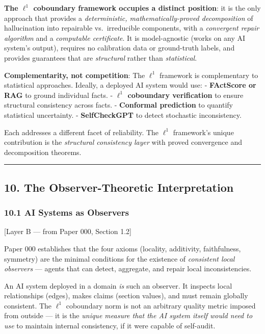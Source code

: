 \documentclass[
]{article}
\begin{document}
\textbf{The \(\ell^1\) coboundary framework occupies a distinct
position}: it is the only approach that provides a \emph{deterministic,
mathematically-proved decomposition} of hallucination into repairable
vs.~irreducible components, with a \emph{convergent repair algorithm}
and a \emph{computable certificate}. It is model-agnostic (works on any
AI system's output), requires no calibration data or ground-truth
labels, and provides guarantees that are \emph{structural} rather than
\emph{statistical}.

\textbf{Complementarity, not competition}: The \(\ell^1\) framework is
complementary to statistical approaches. Ideally, a deployed AI system
would use: - \textbf{FActScore or RAG} to ground individual facts. -
\textbf{\(\ell^1\) coboundary verification} to ensure structural
consistency across facts. - \textbf{Conformal prediction} to quantify
statistical uncertainty. - \textbf{SelfCheckGPT} to detect stochastic
inconsistency.

Each addresses a different facet of reliability. The \(\ell^1\)
framework's unique contribution is the \emph{structural consistency
layer} with proved convergence and decomposition theorems.

\begin{center}\rule{0.5\linewidth}{0.5pt}\end{center}

\subsection{10. The Observer-Theoretic
Interpretation}\label{the-observer-theoretic-interpretation}

\subsubsection{10.1 AI Systems as
Observers}\label{ai-systems-as-observers}

{[}Layer B --- from Paper 000, Section 1.2{]}

Paper 000 establishes that the four axioms (locality, additivity,
faithfulness, symmetry) are the minimal conditions for the existence of
\emph{consistent local observers} --- agents that can detect, aggregate,
and repair local inconsistencies.

An AI system deployed in a domain \emph{is} such an observer. It
inspects local relationships (edges), makes claims (section values), and
must remain globally consistent. The \(\ell^1\) coboundary norm is not
an arbitrary quality metric imposed from outside --- it is the
\emph{unique measure that the AI system itself would need to use} to
maintain internal consistency, if it were capable of self-audit.
\end{document}
